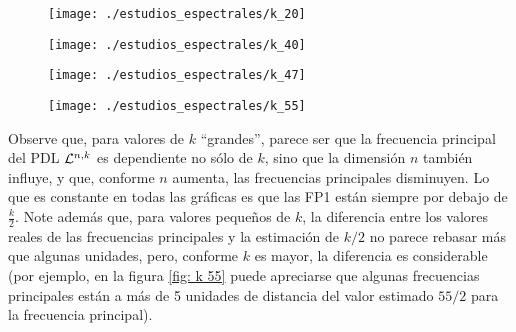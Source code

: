 \begin{figure}[H]
	\centering
	\texttt{[image: ./estudios\_espectrales/k\_20]} 
\end{figure}

\begin{figure}[H]
	\centering
	\texttt{[image: ./estudios\_espectrales/k\_40]} 
\end{figure}

\begin{figure}[H]
	\centering
	\texttt{[image: ./estudios\_espectrales/k\_47]} 
\end{figure}

\begin{figure}[H]
	\centering
	\texttt{[image: ./estudios\_espectrales/k\_55]} 
\end{figure}

Observe que, para valores de $k$ ``grandes'', parece ser que 
la frecuencia principal del PDL $\mathcal{L}^{n,k}$
es dependiente no sólo de $k$, sino que la dimensión $n$
también influye, y que, conforme $n$ aumenta, las
frecuencias principales disminuyen.
Lo que es constante en todas las gráficas es que 
las FP1 están siempre por debajo de
$\frac{k}{2}$.
Note además que, para valores pequeños de $k$, la diferencia
entre los valores reales de las frecuencias principales
y la estimación de $k/2$ no parece rebasar más que algunas
unidades, pero, conforme $k$ es mayor, la diferencia
es considerable (por ejemplo, en la figura \ref{fig: k 55}
puede apreciarse que algunas frecuencias principales están
a más de 5 unidades de distancia del valor estimado $55/2$
para la frecuencia principal). 

